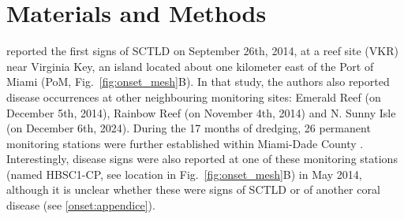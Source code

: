 \documentclass[preprint,12pt,authoryear]{elsarticle}
\begin{document}
\section{Materials and Methods}
\cite{precht2016unprecedented} reported the first signs of SCTLD on September 26th, 2014, at a reef site (VKR) near Virginia Key, an island located about one kilometer east of the Port of Miami (PoM, Fig.~\ref{fig:onset_mesh}B). In that study, the authors also reported disease occurrences at other neighbouring monitoring sites: Emerald Reef (on December 5th, 2014), Rainbow Reef (on November 4th, 2014) and N. Sunny Isle (on December 6th, 2024). %
During the 17 months of dredging, 26 permanent monitoring stations were further established within Miami-Dade County \citep{gintert2019regional}. Interestingly, disease signs were also reported at one of these monitoring stations (named HBSC1-CP, see location in Fig.~\ref{fig:onset_mesh}B) in May 2014, although it is unclear whether these were signs of SCTLD or of another coral disease (see \ref{onset:appendice}).
\end{document}

